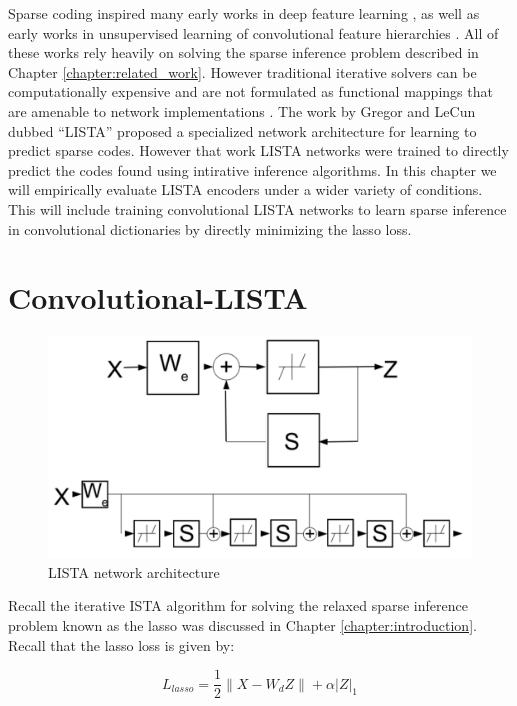 Sparse coding inspired many early works in deep feature learning
\cite{SC,SAE,SAE2}, as well as early works in unsupervised learning of
convolutional feature hierarchies \cite{ConvSC}. All of these works rely
heavily on solving the sparse inference problem described in Chapter
\ref{chapter:related_work}.  However traditional iterative solvers can be
computationally expensive and are not formulated as functional mappings that
are amenable to network implementations \cite{FISTA}. The work by Gregor and
LeCun dubbed ``LISTA'' \cite{LISTA} proposed a specialized network architecture
for learning to predict sparse codes. However that work LISTA networks were
trained to directly predict the codes found using intirative inference
algorithms.  In this chapter we will empirically evaluate LISTA encoders under
a wider variety of conditions. This will include training convolutional LISTA
networks to learn sparse inference in convolutional dictionaries by directly
minimizing the lasso loss.

\section{Convolutional-LISTA} 

\begin{figure}
\centering
\includegraphics[scale=0.3]{./figures/LISTA/LISTA.pdf}
\caption{LISTA network architecture} 
\label{fig:LISTA} 
\end{figure}  

Recall the iterative ISTA algorithm for solving the relaxed sparse inference problem
known as the lasso was discussed in Chapter \ref{chapter:introduction}. 
Recall that the lasso loss is given by:
  
\begin{equation}
L_{lasso} = \frac{1}{2}\|X-W_dZ\| + \alpha |Z|_1 
\label{eqn:lasso} 
\end{equation} 

